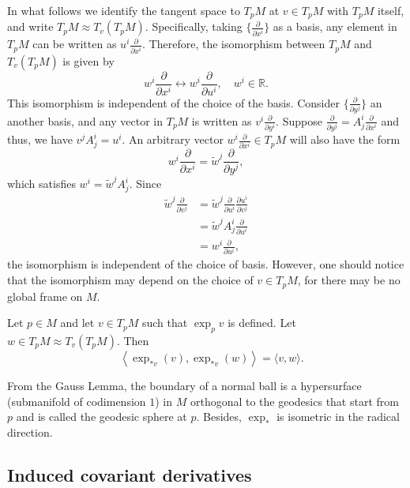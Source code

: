 \documentclass{ctexart}
\begin{document}
In what follows we identify the tangent space to $T_p M$ at $v \in T_p M$ with $T_p M$ itself, and write $T_p M \approx T_v\left(T_p M\right)$. 
Specifically, taking $\{\frac{\partial}{\partial x^i}\}$ as a basis, any element in $T_pM$ can be written as $u^i\frac{\partial}{\partial x^i}$. Therefore, 
the isomorphism between $T_pM$ and $T_v\left(T_pM\right)$ is given by 
$$
w^i\frac{\partial}{\partial x^i}\longleftrightarrow w^i\frac{\partial}{\partial u^i}, \quad w^i\in\mathbb{R}.
$$
This isomorphism is independent of the choice of the basis. Consider $\{\frac{\partial}{\partial y^j}\}$ an another basis, and any vector in $T_pM$ is written as 
$v^i\frac{\partial}{\partial y^i}$. Suppose $\frac{\partial}{\partial y^j}=A_j^i\frac{\partial}{\partial x^i}$ and thus, we have $v^jA_j^i=u^i$.
An arbitrary vector $w^i\frac{\partial}{\partial x^i}\in T_pM$ will also have the form
$$
w^i\frac{\partial}{\partial x^i}=\tilde{w}^j\frac{\partial}{\partial y^j},
$$
which satisfies $w^i=\tilde{w}^jA_j^i$.
Since 
\begin{align*}
  \tilde{w}^j\frac{\partial}{\partial v^j}
  &= \tilde{w}^j \frac{\partial}{\partial u^i} \frac{\partial u^i}{\partial v^j} \\
  &= \tilde{w}^j A_j^i \frac{\partial}{\partial u^i} \\
  &= w^i \frac{\partial}{\partial u^i},
\end{align*}
the isomorphism is independent of the choice of basis. However, one should notice that the isomorphism may depend on the choice of $v\in T_pM$, for 
there may be no global frame on $M$.

\begin{lemma}
    Let $p \in M$ and let $v \in T_p M$ such that $\exp _p v$ is defined. Let $w \in T_p M \approx T_v\left(T_p M\right)$. Then
    $$
    \quad\left\langle\exp_{*v}(v),\exp_{*v}(w)\right\rangle=\langle v, w\rangle.
    $$
\end{lemma}
From the Gauss Lemma, the boundary of a normal ball is a hypersurface (submanifold of codimension $1$) in $M$ 
orthogonal to the geodesics that start from $p$ and is called the  geodesic sphere at $p$. Besides, $\exp_*$ is isometric in the radical direction. 

\subsection*{Induced covariant derivatives}
\end{document}
